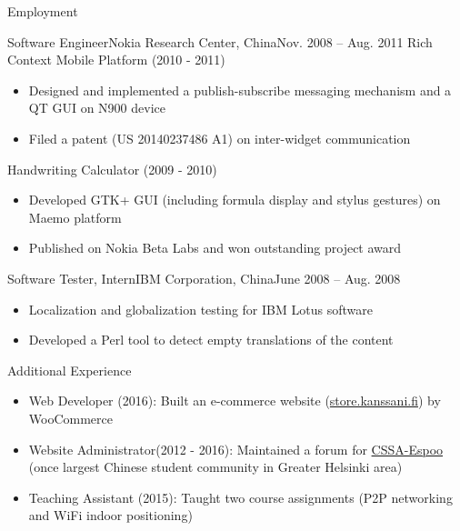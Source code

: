 \documentclass[print]{mcdowellcv}
\begin{document}
\begin{cvsection}{Employment}
		\begin{cvsubsection}{Software Engineer}{Nokia Research Center, China}{Nov. 2008 -- Aug. 2011}
			Rich Context Mobile Platform (2010 - 2011)
			\begin{itemize}
				\item Designed and implemented a publish-subscribe messaging mechanism and a QT GUI on N900 device
				\item Filed a patent (US 20140237486 A1) on inter-widget communication
			\end{itemize}
			\smallskip
			Handwriting Calculator (2009 - 2010)
			\begin{itemize}
				\item Developed GTK+ GUI (including formula display and stylus gestures) on Maemo platform
				\item Published on Nokia Beta Labs and won outstanding project award
			\end{itemize}
		\end{cvsubsection}

		\begin{cvsubsection}{Software Tester, Intern}{IBM Corporation, China}{June 2008 -- Aug. 2008}			
			\begin{itemize}
				\item Localization and globalization testing for IBM Lotus software
				\item Developed a Perl tool to detect empty translations of the content
			\end{itemize}
		\end{cvsubsection}
	\end{cvsection}

	\begin{cvsection}{Additional Experience}
		\begin{cvsubsection}{}{}{}	
			\begin{itemize}
				\item Web Developer (2016): Built an e-commerce website (\url{store.kanssani.fi}) by WooCommerce
				\item Website Administrator(2012 - 2016): Maintained a forum for \href{https://cssa.ayy.fi}{CSSA-Espoo}
				(once largest Chinese student community in Greater Helsinki area)
				\item Teaching Assistant (2015): Taught two course assignments (P2P networking and WiFi indoor positioning)
			\end{itemize}
		\end{cvsubsection}
	\end{cvsection}
	
\end{document}
